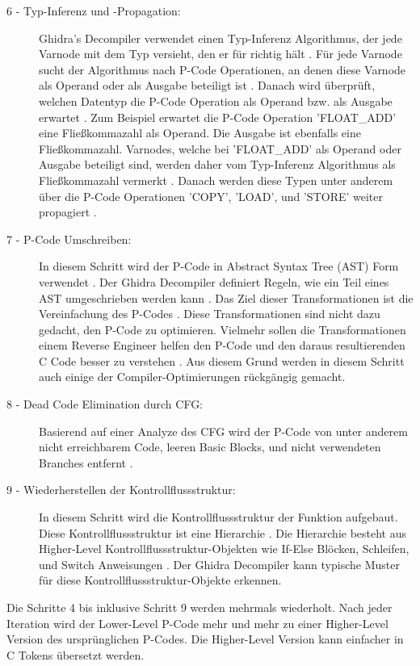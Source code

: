 \begin{description}
\item [6 - Typ-Inferenz und -Propagation:] Ghidra's Decompiler verwendet einen Typ-Inferenz Algorithmus, der jede Varnode mit dem Typ versieht, den er für richtig hält \cite{11} \cite{8}. Für jede Varnode sucht der Algorithmus nach P-Code Operationen, an denen diese Varnode als Operand oder als Ausgabe beteiligt ist \cite{11}. Danach wird überprüft, welchen Datentyp die P-Code Operation als Operand bzw. als Ausgabe erwartet \cite{11}. Zum Beispiel erwartet die P-Code Operation 'FLOAT\_ADD' eine Fließkommazahl als Operand. Die Ausgabe ist ebenfalls eine Fließkommazahl. Varnodes, welche bei 'FLOAT\_ADD' als Operand oder Ausgabe beteiligt sind, werden daher vom Typ-Inferenz Algorithmus als Fließkommazahl vermerkt \cite{8}. %
Danach werden diese Typen unter anderem über die P-Code Operationen 'COPY', 'LOAD', und 'STORE' weiter propagiert \cite{11}.
\item [7 - P-Code Umschreiben:] In diesem Schritt wird der P-Code in Abstract Syntax Tree (AST) Form verwendet \cite{8}. Der Ghidra Decompiler definiert Regeln, wie ein Teil eines AST umgeschrieben werden kann \cite{8}. Das Ziel dieser Transformationen ist die Vereinfachung des P-Codes \cite{8}. Diese Transformationen sind nicht dazu gedacht, den P-Code zu optimieren. Vielmehr sollen die Transformationen einem Reverse Engineer helfen den P-Code und den daraus resultierenden C Code besser zu verstehen \cite{8}. Aus diesem Grund werden in diesem Schritt auch einige der Compiler-Optimierungen rückgängig gemacht.
\item [8 - Dead Code Elimination durch CFG:] Basierend auf einer Analyze des CFG wird der P-Code von unter anderem nicht erreichbarem Code, leeren Basic Blocks, und nicht verwendeten Branches entfernt \cite{8}.
\item[9 - Wiederherstellen der Kontrollflussstruktur:] In diesem Schritt wird die Kontrollflussstruktur der Funktion aufgebaut. Diese Kontrollflussstruktur ist eine Hierarchie \cite{8}. Die Hierarchie besteht aus Higher-Level Kontrollflussstruktur-Objekten wie If-Else Blöcken, Schleifen, und Switch Anweisungen \cite{8}. Der Ghidra Decompiler kann typische Muster für diese Kontrollflussstruktur-Objekte erkennen.
\end{description}

\noindent
Die Schritte 4 bis inklusive Schritt 9 werden mehrmals wiederholt. Nach jeder Iteration wird der Lower-Level P-Code mehr und mehr zu einer Higher-Level Version des ursprünglichen P-Codes. Die Higher-Level Version kann einfacher in C Tokens übersetzt werden.

